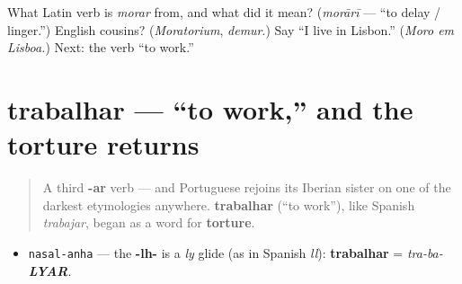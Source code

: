 \begin{tcolorbox}[breakable,colback=teal!4,colframe=teal!35!black,title={Before you move on}]
What Latin verb is \emph{morar} from, and what did it mean? (\emph{morārī} — \textquotedblleft{}to delay / linger.\textquotedblright{}) English cousins? (\emph{Moratorium}, \emph{demur}.) Say \textquotedblleft{}I live in Lisbon.\textquotedblright{} (\emph{Moro em Lisboa.}) Next: the verb \textquotedblleft{}to work.\textquotedblright{}
\end{tcolorbox}
\section[trabalhar]{trabalhar — \textquotedblleft{}to work,\textquotedblright{} and the torture returns}

\label{lesson:PT-C05-trabalhar}



\begin{quote}
A third \textbf{-ar} verb — and Portuguese rejoins its Iberian sister on one of the darkest etymologies anywhere. \textbf{trabalhar} (\textquotedblleft{}to work\textquotedblright{}), like Spanish \emph{trabajar}, began as a word for \textbf{torture}.
\end{quote}

\begin{sounds}
\begin{itemize}
\raggedright
  \item \texttt{nasal-anha} — the \textbf{-lh-} is a \emph{ly} glide (as in Spanish \emph{ll}): \textbf{trabalhar} = \emph{tra-ba-\textbf{LYAR}}.
\end{itemize}
\end{sounds}

